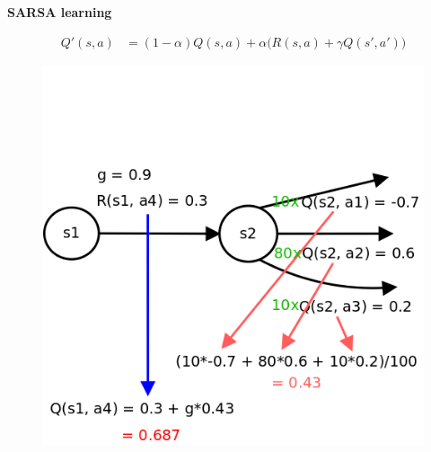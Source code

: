 \documentclass[xcolor=dvipsnames]{beamer}
\begin{document}
\begin{frame}{\bf SARSA learning}

\begin{align*}
Q'(s, a) &= (1-\alpha)Q(s, a) + \alpha\Big(R(s, a) + \gamma Q(s', a')\Big)
\end{align*}

\begin{figure}
  \includegraphics[scale=0.23]{../../diagrams/sarsa_learning_detail.png}
\end{figure}

\end{frame}
\end{document}
